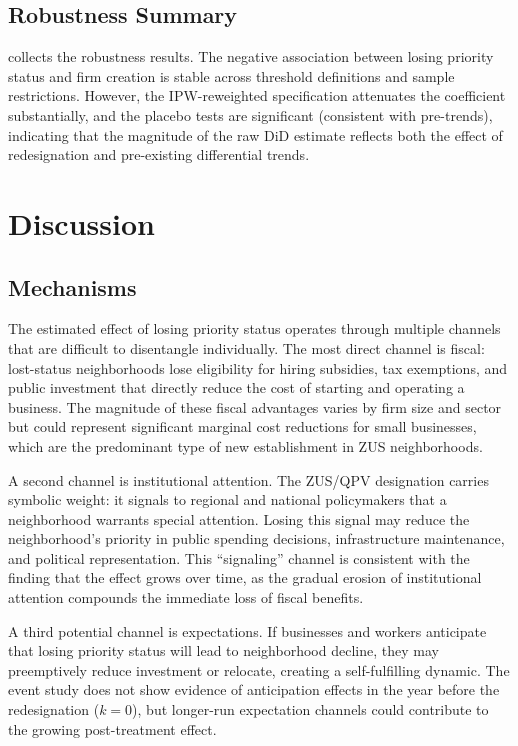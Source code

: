 \documentclass[12pt]{article}
\begin{document}
\subsection{Robustness Summary}

 collects the robustness results. The negative association between losing priority status and firm creation is stable across threshold definitions and sample restrictions. However, the IPW-reweighted specification attenuates the coefficient substantially, and the placebo tests are significant (consistent with pre-trends), indicating that the magnitude of the raw DiD estimate reflects both the effect of redesignation and pre-existing differential trends.




\section{Discussion}
\label{sec:discussion}

\subsection{Mechanisms}

The estimated effect of losing priority status operates through multiple channels that are difficult to disentangle individually. The most direct channel is fiscal: lost-status neighborhoods lose eligibility for hiring subsidies, tax exemptions, and public investment that directly reduce the cost of starting and operating a business. The magnitude of these fiscal advantages varies by firm size and sector but could represent significant marginal cost reductions for small businesses, which are the predominant type of new establishment in ZUS neighborhoods.

A second channel is institutional attention. The ZUS/QPV designation carries symbolic weight: it signals to regional and national policymakers that a neighborhood warrants special attention. Losing this signal may reduce the neighborhood's priority in public spending decisions, infrastructure maintenance, and political representation. This ``signaling'' channel is consistent with the finding that the effect grows over time, as the gradual erosion of institutional attention compounds the immediate loss of fiscal benefits.

A third potential channel is expectations. If businesses and workers anticipate that losing priority status will lead to neighborhood decline, they may preemptively reduce investment or relocate, creating a self-fulfilling dynamic. The event study does not show evidence of anticipation effects in the year before the redesignation ($k = 0$), but longer-run expectation channels could contribute to the growing post-treatment effect.
\end{document}
